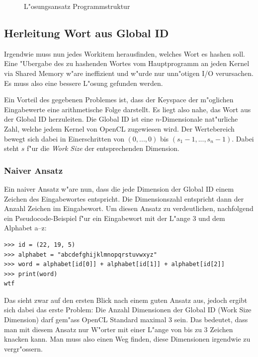 \begin{refsection}
\begin{figure}[H]
	\centering
	
	\caption{L"osungsansatz Programmstruktur}
	\label{img:crypto:programm-struktur}
\end{figure}


\subsection{Herleitung Wort aus Global ID}

Irgendwie muss nun jedes Workitem herausfinden, welches Wort es hashen soll. Eine
"Ubergabe des zu hashenden Wortes vom Hauptprogramm an jeden Kernel via Shared
Memory w"are ineffizient und w"urde nur unn"otigen I/O verursachen. Es muss also
eine bessere L"osung gefunden werden.

Ein Vorteil des gegebenen Problemes ist, dass der Keyspace der m"oglichen
Eingabewerte eine arithmetische Folge darstellt. Es liegt also nahe, das Wort
aus der Global ID herzuleiten. Die Global ID ist eine $n$-Dimensionale
nat"urliche Zahl, welche jedem Kernel von OpenCL zugewiesen wird. Der
Wertebereich bewegt sich dabei in Einerschritten von $(0, ..., 0)$ bis $(s_1-1,
..., s_n-1)$. Dabei steht $s$ f"ur die \textit{Work Size} der entsprechenden
Dimension.

\subsubsection{Naiver Ansatz}

Ein naiver Ansatz w"are nun, dass die jede Dimension der Global ID einem Zeichen
des Eingabewortes entspricht. Die Dimensionszahl entspricht dann der Anzahl
Zeichen im Eingabewort. Um diesen Ansatz zu verdeutlichen, nachfolgend ein
Pseudocode-Beispiel f"ur ein Eingabewort mit der L"ange 3 und dem Alphabet a--z:

\begin{small}
\begin{verbatim}
>>> id = (22, 19, 5)
>>> alphabet = "abcdefghijklmnopqrstuvwxyz"
>>> word = alphabet[id[0]] + alphabet[id[1]] + alphabet[id[2]]
>>> print(word)
wtf
\end{verbatim}
\end{small}

\noindent Das sieht zwar auf den ersten Blick nach einem guten Ansatz aus,
jedoch ergibt sich dabei das erste Problem: Die Anzahl Dimensionen der Global ID
(Work Size Dimension) darf gem"ass OpenCL Standard\cite{crypto:opencl_ref}
maximal 3 sein. Das bedeutet, dass man mit diesem Ansatz nur W"orter mit einer
L"ange von bis zu 3 Zeichen knacken kann. Man muss also einen Weg finden, diese
Dimensionen irgendwie zu vergr"ossern.


\end{refsection}
